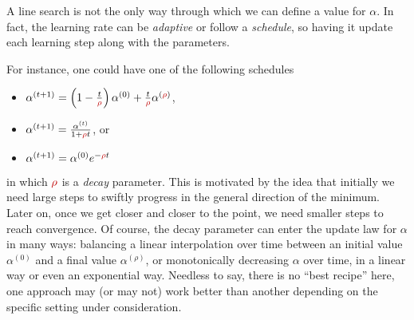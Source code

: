 
A line search is not the only way through which we can define a value for $\alpha$. In fact, the learning rate can be \emph{adaptive} or follow a \emph{schedule}, so having it update each learning step along with the parameters.

For instance, one could have one of the following schedules
\begin{itemize}
	\item $\alpha^{(t+1)} = \left(1-\frac{t}{{\color{red}\rho}} \right)\alpha^{(0)} + \frac{t}{{\color{red}\rho}} \alpha^{({\color{red}\rho})}$, 
	\item $\alpha^{(t+1)} = \frac{\alpha^{(t)}}{1+ {\color{red}\rho} t}$, or
	\item $\alpha^{(t+1)} =  \alpha^{(0)}e^{-{\color{red}\rho} t}$
\end{itemize}
in which ${\color{red}\rho}$ is a \emph{decay} parameter. This is motivated by the idea that initially we need large steps to swiftly progress in the general direction of the minimum. Later on, once we get closer and closer to the point, we need smaller steps to reach convergence. Of course, the decay parameter can enter the update law for $\alpha$ in many ways: balancing a linear interpolation over time between an initial value $\alpha^{(0)}$ and a final value $\alpha^{(\rho)}$, or monotonically decreasing $\alpha$ over time, in a linear way or even an exponential way. Needless to say, there is no ``best recipe'' here, one approach may (or may not) work better than another depending on the specific setting under consideration.